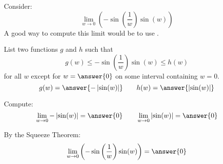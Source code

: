 \documentclass{ximera}
\author{Bart Snapp}
\begin{document}
\begin{exercise}


Consider:
\[
\lim_{w\to 0} \left(-\sin \left(\frac{1}{w}\right) \sin (w)\right)
\]
A good way to compute this limit would be to use .
\begin{exercise}
List two functions $g$ and $h$ such that
\[
g(w)\le -\sin \left(\frac{1}{w}\right) \sin (w) \le h(w)
\]
for all $w$ except for $w=\answer{0}$ on some interval containing $w=0$.
\[
g(w)=\answer{-\left| \sin (w)\right|}\qquad h(w) =\answer{\left| \sin (w)\right|}
\]
\begin{exercise}
Compute:
\[
\lim_{w \to 0}-\left| \sin (w)\right| = \answer{0}\qquad \lim_{w\to 0}\left| \sin (w)\right| = \answer{0}
\]
\begin{exercise}
By the Squeeze Theorem:
\[
\lim_{w\to 0} \left(-\sin \left(\frac{1}{w}\right) \sin (w)\right) = \answer{0}
\]
\end{exercise}
\end{exercise}
\end{exercise}
\end{exercise}
\end{document}
